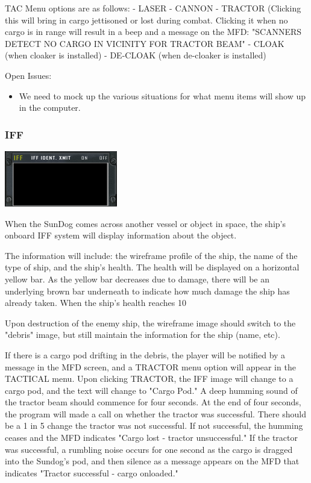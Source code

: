 \begin{itemize}
TAC Menu options are as follows: 
- LASER
- CANNON
- TRACTOR (Clicking this will bring in cargo jettisoned or lost during combat. Clicking it when no cargo is in range will result in a beep and a message on the MFD: "SCANNERS DETECT NO CARGO IN VICINITY FOR TRACTOR BEAM"
- CLOAK (when cloaker is installed)
- DE-CLOAK (when de-cloaker is installed)



Open Issues:
\begin{itemize}


\item We need to mock up the various situations for what menu items
will show up in the computer. 
\end{itemize}

\subsubsection{IFF}

\includegraphics[scale=0.70]{images/iff.png}

When the SunDog comes across another vessel or object in space, the ship's
onboard IFF system will display information about the object.  

The information will include: the wireframe profile of the ship, the name of the type of ship, and the ship's health. The health will be displayed on a horizontal yellow bar. As the yellow bar decreases due to damage, there will be an underlying brown bar underneath to indicate how much damage the ship has already taken. When the ship's health reaches 10%

Upon destruction of the enemy ship, the wireframe image should switch to the "debris" image, but still maintain the information for the ship (name, etc). 

If there is a cargo pod drifting in the debris, the player will be notified by a message in the MFD screen, and a TRACTOR menu option will appear in the TACTICAL menu. Upon clicking TRACTOR, the IFF image will change to a cargo pod, and the text will change to "Cargo Pod." A deep humming sound of the tractor beam should commence for four seconds. At the end of four seconds, the program will made a call on whether the tractor was successful. There should be a 1 in 5 change the tractor was not successful.  If not successful, the humming ceases and the MFD indicates "Cargo lost - tractor unsuccessful." If the tractor was successful, a rumbling noise occurs for one second as the cargo is dragged into the Sundog's pod, and then silence as a message appears on the MFD that indicates "Tractor successful - cargo onloaded." 


\end{itemize}
